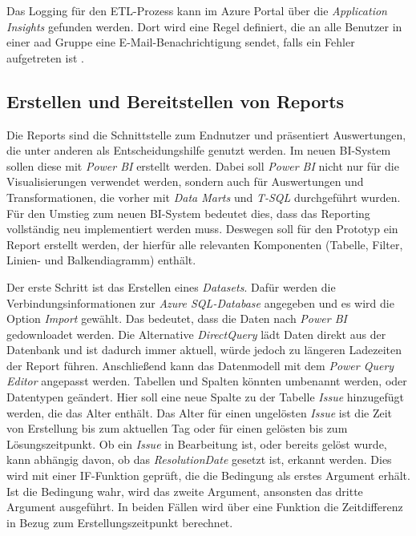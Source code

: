 Das Logging für den ETL-Prozess kann im Azure Portal über die \textit{Application Insights} gefunden werden. Dort wird eine Regel definiert, die an alle Benutzer in einer \ac{aad} Gruppe eine E-Mail-Benachrichtigung sendet, falls ein Fehler aufgetreten ist \cite[vgl.][]{satapathi_hands-azure_2021, sreeram_azure_2020}.

\subsection{Erstellen und Bereitstellen von Reports}
Die Reports sind die Schnittstelle zum Endnutzer und präsentiert Auswertungen, die unter anderen als Entscheidungshilfe genutzt werden. Im neuen BI-System sollen diese mit \textit{Power BI} erstellt werden. Dabei soll \textit{Power BI} nicht nur für die Visualisierungen verwendet werden, sondern auch für Auswertungen und Transformationen, die vorher mit \textit{Data Marts} und \textit{T-SQL} durchgeführt wurden. Für den Umstieg zum neuen BI-System bedeutet dies, dass das Reporting vollständig neu implementiert werden muss. Deswegen soll für den Prototyp ein Report erstellt werden, der hierfür alle relevanten Komponenten (Tabelle, Filter, Linien- und Balkendiagramm) enthält.

Der erste Schritt ist das Erstellen eines \textit{Datasets}. Dafür werden die Verbindungsinformationen zur \textit{Azure SQL-Database} angegeben und es wird die Option \textit{Import} gewählt. Das bedeutet, dass die Daten nach \textit{Power BI} gedownloadet werden. Die Alternative \textit{DirectQuery} lädt Daten direkt aus der Datenbank und ist dadurch immer aktuell, würde jedoch zu längeren Ladezeiten der Report führen. Anschließend kann das Datenmodell mit dem \textit{Power Query Editor} angepasst werden. Tabellen und Spalten könnten umbenannt werden, oder Datentypen geändert. Hier soll eine neue Spalte zu der Tabelle \textit{Issue} hinzugefügt werden, die das Alter enthält. Das Alter für einen ungelösten \textit{Issue} ist die Zeit von Erstellung bis zum aktuellen Tag oder für einen gelösten bis zum Lösungszeitpunkt. Ob ein \textit{Issue} in Bearbeitung ist, oder bereits gelöst wurde, kann abhängig davon, ob das \textit{ResolutionDate} gesetzt ist, erkannt werden. Dies wird mit einer IF-Funktion geprüft, die die Bedingung als erstes Argument erhält. Ist die Bedingung wahr, wird das zweite Argument, ansonsten das dritte Argument ausgeführt. In beiden Fällen wird über eine Funktion die Zeitdifferenz in Bezug zum Erstellungszeitpunkt berechnet.

